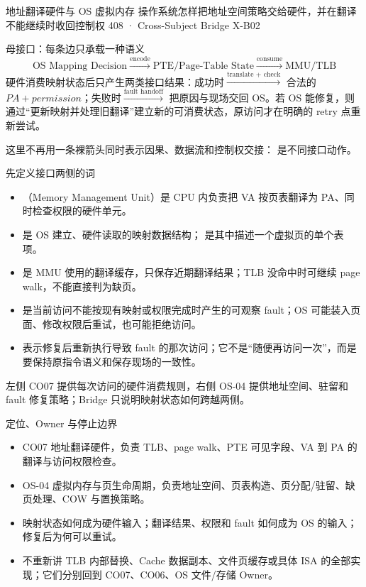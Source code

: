 \documentclass[UTF8,fontset=none,11pt,a4paper]{ctexart}
\begin{document}
\handbooktitle
  {地址翻译硬件与 OS 虚拟内存}
  {操作系统怎样把地址空间策略交给硬件，并在翻译不能继续时收回控制权}
  {408 · Cross-Subject Bridge X-B02}

\begin{corebox}{母接口：每条边只承载一种语义}
\[
\boxed{
\text{OS Mapping Decision}
\xrightarrow{\text{encode}}
\text{PTE/Page-Table State}
\xrightarrow{\text{consume}}
\text{MMU/TLB}
}
\]
硬件消费映射状态后只产生两类接口结果：成功时\(\xrightarrow{\text{translate + check}}\) 合法的 \(PA+permission\)；失败时\(\xrightarrow{\text{fault handoff}}\) 把原因与现场交回 OS。若 OS 能修复，则通过“更新映射并处理旧翻译”建立新的可消费状态，原访问才在明确的 retry 点重新尝试。

这里不再用一条裸箭头同时表示因果、数据流和控制权交接： 是不同接口动作。
\end{corebox}

\begin{methodbox}{先定义接口两侧的词}
\begin{itemize}
\item {}（Memory Management Unit）是 CPU 内负责把 VA 按页表翻译为 PA、同时检查权限的硬件单元。
\item {}是 OS 建立、硬件读取的映射数据结构； 是其中描述一个虚拟页的单个表项。
\item {} 是 MMU 使用的翻译缓存，只保存近期翻译结果；TLB 没命中时可继续 page walk，不能直接判为缺页。
\item {} 是当前访问不能按现有映射或权限完成时产生的可观察 fault；OS 可能装入页面、修改权限后重试，也可能拒绝访问。
\item {} 表示修复后重新执行导致 fault 的那次访问；它不是“随便再访问一次”，而是要保持原指令语义和保存现场的一致性。
\end{itemize}
左侧 CO07 提供每次访问的硬件消费规则，右侧 OS-04 提供地址空间、驻留和 fault 修复策略；Bridge 只说明映射状态如何跨越两侧。
\end{methodbox}

\begin{methodbox}{定位、Owner 与停止边界}
\begin{itemize}
\item {}CO07 地址翻译硬件，负责 TLB、page walk、PTE 可见字段、VA 到 PA 的翻译与访问权限检查。
\item {}OS-04 虚拟内存与页生命周期，负责地址空间、页表构造、页分配/驻留、缺页处理、COW 与置换策略。
\item {}映射状态如何成为硬件输入；翻译结果、权限和 fault 如何成为 OS 的输入；修复后为何可以重试。
\item {}不重新讲 TLB 内部替换、Cache 数据副本、文件页缓存或具体 ISA 的全部实现；它们分别回到 CO07、CO06、OS 文件/存储 Owner。
\end{itemize}
\end{methodbox}
\end{document}
